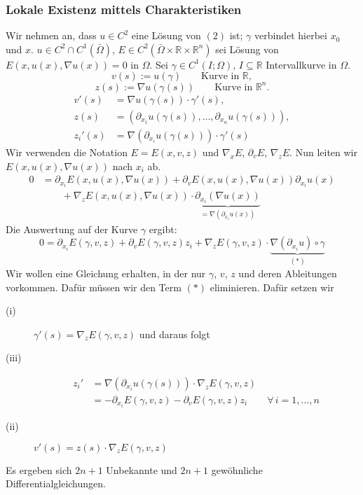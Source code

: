 \subsubsection{Lokale Existenz mittels Charakteristiken} 
\label{ssub:lokale_existenz_mittels_charakteristiken}
Wir nehmen an, dass $u \in C^2$ eine Lösung von $(2)$ ist; $\gamma$ verbindet hierbei $x_0$ und $x$. 
$u \in C^2 \cap C^1(\bar{\Omega})$, $E \in C^2(\bar{\Omega} \times \mathbb{R} \times \mathbb{R}^n)$ sei Lösung von $E(x,u(x), \nabla u(x)) = 0$ in $\Omega$. Sei $\gamma \in C^1(I;\Omega)$, $I \subseteq \mathbb{R}$ Intervallkurve in $\Omega$. \\
\[
	v(s) := u(\gamma) \qquad \text{Kurve in }\mathbb{R},
\] 
\[
	z(s) :=  \nabla u(\gamma(s)) \qquad \text{Kurve in }\mathbb{R}^n.
\]
\begin{align*}
	v'(s) &=  \nabla u(\gamma(s)) \cdot \gamma'(s), \\
	z(s) &= (\partial_{x_1}u(\gamma(s)), \dots, \partial_{x_n}u(\gamma(s))), \\
	z_i'(s) &=  \nabla (\partial_{x_i} u(\gamma(s))) \cdot \gamma'(s)
\end{align*}
Wir verwenden die Notation $E = E(x,v,z)$ und $ \nabla_x E$, $\partial_v E$, $ \nabla_z E$. Nun leiten wir \\$E(x,u(x), \nabla u(x))$ nach $x_i$ ab.
\begin{align*}
	0 &= \partial_{x_i} E(x, u(x),  \nabla u(x)) + \partial_{v} E(x,u(x), \nabla u(x))\partial_{x_i} u(x) \\
	&\qquad +  \nabla_z E(x,u(x), \nabla u(x)) \cdot \underset{=  \nabla (\partial_{x_i}u(x))}{\underbrace{\partial_{x_i}( \nabla u(x))}}
\end{align*}
Die Auswertung auf der Kurve $\gamma$ ergibt:
\[
	0 = \partial_{x_i} E(\gamma,v,z) + \partial_v E(\gamma,v,z)z_i +  \nabla_z E(\gamma, v,z) \cdot  \underset{(*)}{\underbrace{\nabla (\partial_{x_i}u) \circ \gamma}}
\]
Wir wollen eine Gleichung erhalten, in der nur $\gamma$, $v$, $z$ und deren Ableitungen vorkommen. Dafür müssen wir den Term $(*)$ eliminieren. Dafür setzen wir
\begin{description}
	\item[(i)]$\gamma'(s)=  \nabla _z E(\gamma,v,z)$ und daraus folgt
	\item[(iii)] \begin{align*}
		z_i' &=  \nabla (\partial_{x_i} u(\gamma(s)))\cdot  \nabla _z E(\gamma,v,z) \\
		&= - \partial_{x_i} E(\gamma,v,z) - \partial_v E(\gamma,v,z)z_i \qquad \forall\, i=1,\dots,n
	\end{align*} 
	\item[(ii)] $v'(s) = z(s) \cdot  \nabla_z E(\gamma,v,z)$
\end{description}
Es ergeben sich $2n+1$ Unbekannte und $2n+1$ gewöhnliche Differentialgleichungen.

